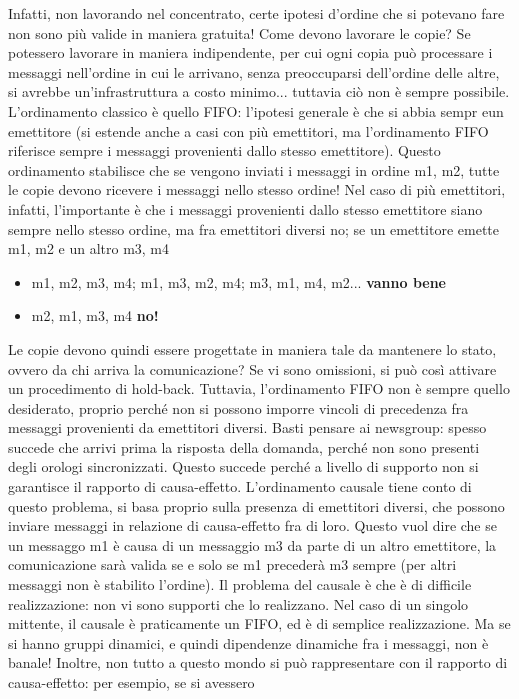 Infatti, non lavorando nel concentrato, certe ipotesi d'ordine che si potevano fare non sono più valide in maniera
gratuita! Come devono lavorare le copie?
Se potessero lavorare in maniera indipendente, per cui ogni copia può processare i messaggi nell'ordine in cui le
arrivano, senza preoccuparsi dell'ordine delle altre, si avrebbe un'infrastruttura a costo minimo... tuttavia ciò non
è sempre possibile.
L'ordinamento classico è quello FIFO: l'ipotesi generale è che si abbia sempr eun emettitore (si estende anche a casi
con più emettitori, ma l'ordinamento FIFO riferisce sempre i messaggi provenienti dallo stesso emettitore). Questo
ordinamento stabilisce che se vengono inviati i messaggi in ordine m1, m2, tutte le copie devono ricevere i messaggi
nello stesso ordine! Nel caso di più emettitori, infatti, l'importante è che i messaggi provenienti dallo stesso
emettitore siano sempre nello stesso ordine, ma fra emettitori diversi no; se un emettitore emette m1, m2 e un altro
m3, m4
\begin{itemize}
 \item m1, m2, m3, m4; m1, m3, m2, m4; m3, m1, m4, m2... \textbf{vanno bene}
 \item m2, m1, m3, m4 \textbf{no!}
\end{itemize}
Le copie devono quindi essere progettate in maniera tale da mantenere lo stato, ovvero da chi arriva la comunicazione?
Se vi sono omissioni, si può così attivare un procedimento di hold-back.
Tuttavia, l'ordinamento FIFO non è sempre quello desiderato, proprio perché non si possono imporre vincoli di
precedenza fra messaggi provenienti da emettitori diversi. Basti pensare ai newsgroup: spesso succede che arrivi
prima la risposta della domanda, perché non sono presenti degli orologi sincronizzati. Questo succede perché a livello
di supporto non si garantisce il rapporto di causa-effetto.
L'ordinamento causale tiene conto di questo problema, si basa proprio sulla presenza di emettitori diversi, che
possono inviare messaggi in relazione di causa-effetto fra di loro. Questo vuol dire che se un messaggo m1 è causa di
un messaggio m3 da parte di un altro emettitore, la comunicazione sarà valida se e solo se m1 precederà m3 sempre (per
altri messaggi non è stabilito l'ordine).
Il problema del causale è che è di difficile realizzazione: non vi sono supporti che lo realizzano. Nel caso di un
singolo mittente, il causale è praticamente un FIFO, ed è di semplice realizzazione. Ma se si hanno gruppi dinamici,
e quindi dipendenze dinamiche fra i messaggi, non è banale!
Inoltre, non tutto a questo mondo si può rappresentare con il rapporto di causa-effetto: per esempio, se si avessero
